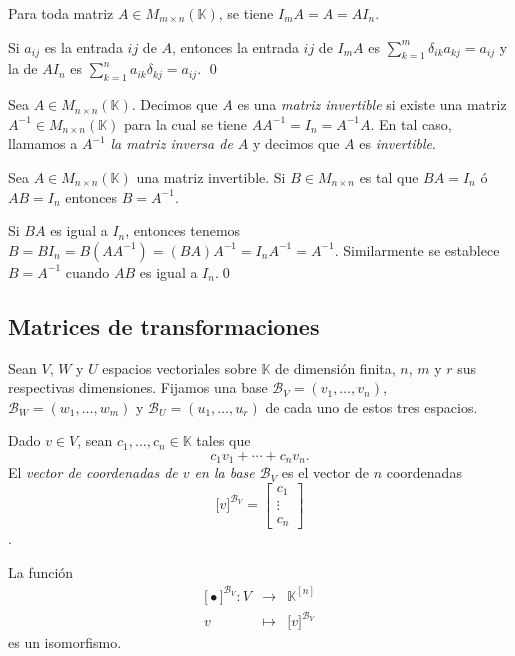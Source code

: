 \begin{prop}
Para toda matriz $A\in M_{m\times n}(\mathbb{K})$, se tiene $I_mA=A=AI_n$.
\end{prop}

\dem Si $a_{ij}$ es la entrada $ij$ de $A$, entonces la entrada $ij$ de $I_mA$ es $\sum_{k=1}^m \delta_{ik}a_{kj}=a_{ij}$ y la de $AI_n$ es $\sum_{k=1}^na_{ik}\delta_{kj}=a_{ij}$. \qed

\begin{defn}
Sea $A\in M_{n\times n}(\mathbb{K})$. Decimos que $A$ es una \emph{matriz invertible} si existe una matriz $A^{-1}\in M_{n\times n}(\mathbb{K})$ para la cual se tiene $AA^{-1}=I_n=A^{-1}A$. En tal caso, llamamos a $A^{-1}$ \emph{la matriz inversa de $A$} y decimos que $A$ es \emph{invertible}.
\end{defn}

\begin{prop}
Sea $A\in M_{n\times n}(\mathbb{K})$ una matriz invertible. Si $B\in M_{n\times n}$ es tal que $BA=I_n$ \'o $AB=I_n$ entonces $B=A^{-1}$.
\end{prop}

\dem Si $BA$ es igual a $I_n$, entonces tenemos $B=BI_n=B(AA^{-1})=(BA)A^{-1}=I_nA^{-1}=A^{-1}$. Similarmente se establece $B=A^{-1}$ cuando $AB$ es igual a $I_n$.\qed

\subsection*{Matrices de transformaciones}

Sean $V$, $W$ y $U$ espacios vectoriales sobre $\mathbb{K}$ de dimensi\'on finita, $n$, $m$ y $r$ sus respectivas dimensiones. Fijamos una base $\mathcal{B}_V=(v_1,\ldots,v_n)$, $\mathcal{B}_W=(w_1,\ldots,w_m)$ y $\mathcal{B}_U=(u_1,\ldots,u_r)$ de cada uno de estos tres espacios.

\begin{defn}
Dado $v\in V$, sean $c_1,\ldots,c_n\in \mathbb{K}$ tales que
$$c_1v_1+\cdots+c_nv_n.$$
El \emph{vector de coordenadas de $v$ en la base $\mathcal{B}_V$} es el vector de $n$ coordenadas 
$$\Big[ v \Big]^{\mathcal{B}_V}=\left[\begin{array}{c}
  c_{1}\\
  \vdots\\
  c_{n}
  \end{array}\right]$$.
\end{defn}

\begin{prop}
La funci\'on
\begin{eqnarray*}
\Big[ \bullet \Big]^{\mathcal{B}_V}: V & \longrightarrow & \mathbb{K}^{[n]}\\
v & \longmapsto & \Big[ v \Big]^{\mathcal{B}_V}
\end{eqnarray*}
es un isomorfismo.
\end{prop}


